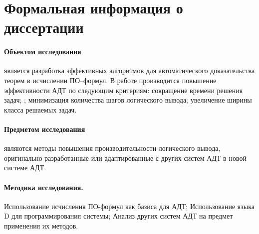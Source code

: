 \section{Формальная информация о диссертации}


\paragraph{Объектом исследования}\hspace{-1em} является разработка эффективных алгоритмов для автоматического доказательства теорем в исчислении ПО--формул. В работе производится повышение эффективности АДТ по следующим критериям: сокращение времени решения задач; ; минимизация количества шагов логического вывода; увеличение ширины класса решаемых задач. %

\paragraph{Предметом исследования}\hspace{-1em} являются методы повышения производительности логического вывода, оригинально разработанные или адаптированные с других систем АДТ в новой системе АДТ.

\paragraph{Методика исследования.}\hspace{-1em} Использование исчисления ПО-формул как базиса для АДТ; Использование языка D для программирования системы; Анализ других систем АДТ на предмет применения их методов.

